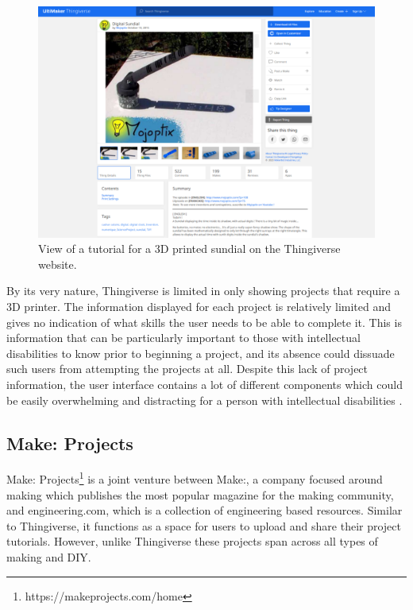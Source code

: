 \documentclass{l4proj}
\begin{document}
\begin{figure}[htb]
    \centering
    \includegraphics[width=0.75\linewidth]{images/thingiverse.png}    

    \caption{View of a tutorial for a 3D printed sundial on the Thingiverse website.
    }
    \label{fig:thingiverse} 
\end{figure}

By its very nature, Thingiverse is limited in only showing projects that require a 3D printer. The information displayed for each project is relatively limited and gives no indication of what skills the user needs to be able to complete it. This is information that can be particularly important to those with intellectual disabilities to know prior to beginning a project, and its absence could dissuade such users from attempting the projects at all. Despite this lack of project information, the user interface contains a lot of different components which could be easily overwhelming and distracting for a person with intellectual disabilities \citep{Cha2013}. 

\subsection{Make: Projects}
Make: Projects\footnote{https://makeprojects.com/home} is a joint venture between Make:, a company focused around making which publishes the most popular magazine for the making community, and engineering.com, which is a collection of engineering based resources. Similar to Thingiverse, it functions as a space for users to upload and share their project tutorials. However, unlike Thingiverse these projects span across all types of making and DIY. 
\end{document}
